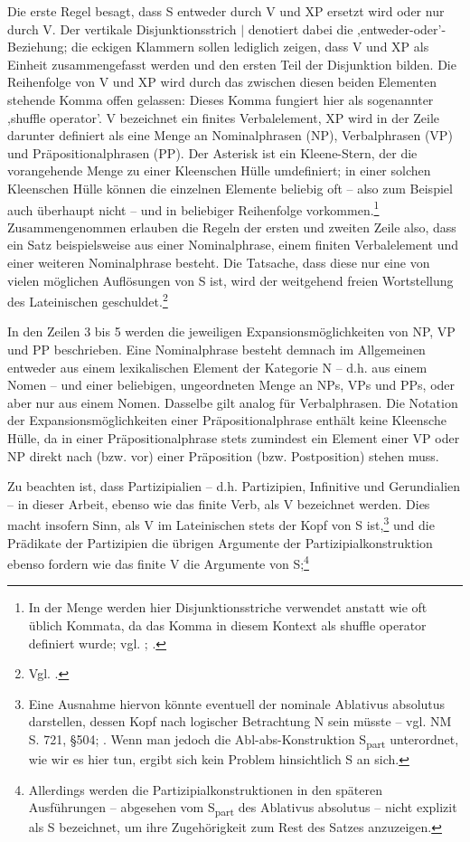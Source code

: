 \documentclass[12pt,a4paper]{article}
\begin{document}
Die erste Regel besagt, dass S entweder durch V und XP ersetzt wird oder nur durch V. Der vertikale Disjunktionsstrich $\mid$ denotiert dabei die ,entweder-oder'-Beziehung; die eckigen Klammern sollen lediglich zeigen, dass V und XP als Einheit zusammengefasst werden und den ersten Teil der Disjunktion bilden. Die Reihenfolge von V und XP wird durch das zwischen diesen beiden Elementen stehende Komma offen gelassen: Dieses Komma fungiert hier als sogenannter ,shuffle operator'. V bezeichnet ein finites Verbalelement, XP wird in der Zeile darunter definiert als eine Menge an Nominalphrasen (NP), Verbalphrasen (VP) und Präpositionalphrasen (PP). Der Asterisk ist ein Kleene-Stern, der die vorangehende Menge zu einer Kleenschen Hülle umdefiniert; in einer solchen Kleenschen Hülle können die einzelnen Elemente beliebig oft -- also zum Beispiel auch überhaupt nicht -- und in beliebiger Reihenfolge vorkommen.\footnote{In der Menge werden hier Disjunktionsstriche verwendet anstatt wie oft üblich Kommata, da das Komma in diesem Kontext als shuffle operator definiert wurde; vgl. \cite[26]{Skript}; \cite{Snijders}.} Zusammengenommen erlauben die Regeln der ersten und zweiten Zeile also, dass ein Satz beispielsweise aus einer Nominalphrase, einem finiten Verbalelement und einer weiteren Nominalphrase besteht. Die Tatsache, dass diese nur eine von vielen möglichen Auflösungen von S ist, wird der weitgehend freien Wortstellung des Lateinischen geschuldet.\footnote{Vgl. \cite[19]{Rohrer}.}

In den Zeilen 3 bis 5 werden die jeweiligen Expansionsmöglichkeiten von NP, VP und PP beschrieben. Eine Nominalphrase besteht demnach im Allgemeinen entweder aus einem lexikalischen Element der Kategorie N – d.h. aus einem Nomen -- und einer beliebigen, ungeordneten Menge an NPs, VPs und PPs, oder aber nur aus einem Nomen. Dasselbe gilt analog für Verbalphrasen. Die Notation der Expansionsmöglichkeiten einer Präpositionalphrase enthält keine Kleensche Hülle, da in einer Präpositionalphrase stets zumindest ein Element einer VP oder NP direkt nach (bzw. vor) einer Präposition (bzw. Postposition) stehen muss.

Zu beachten ist, dass Partizipialien – d.h. Partizipien, Infinitive und Gerundialien -- in dieser Arbeit, ebenso wie das finite Verb, als V bezeichnet werden. Dies macht insofern Sinn, als V im Lateinischen stets der Kopf von S ist,\footnote{Eine Ausnahme hiervon könnte eventuell der nominale Ablativus absolutus darstellen, dessen Kopf nach logischer Betrachtung N sein müsste -- vgl. NM S. 721, §504; \cite[64]{Falk}. Wenn man jedoch die Abl-abs-Konstruktion S\textsubscript{part} unterordnet, wie wir es hier tun, ergibt sich kein Problem hinsichtlich S an sich.} und die Prädikate der Partizipien die übrigen Argumente der Partizipialkonstruktion ebenso fordern wie das finite V die Argumente von S;\footnote{Allerdings werden die Partizipialkonstruktionen in den späteren Ausführungen -- abgesehen vom S\textsubscript{part} des Ablativus absolutus -- nicht explizit als S bezeichnet, um ihre Zugehörigkeit zum Rest des Satzes anzuzeigen.}
\end{document}
